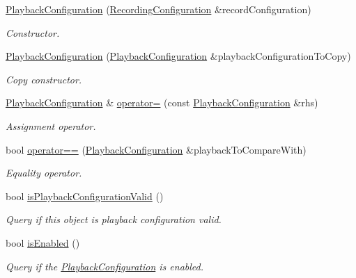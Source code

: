 \begin{DoxyCompactItemize}
\item 
\hyperlink{class_playback_configuration_a9c8f27b87b192cb6c34517087975bf48}{Playback\+Configuration} (\hyperlink{class_recording_configuration}{Recording\+Configuration} \&record\+Configuration)
\begin{DoxyCompactList}\small\item\em Constructor. \end{DoxyCompactList}\item 
\hyperlink{class_playback_configuration_a49c473c5400f547d931a1fc5d9164a68}{Playback\+Configuration} (\hyperlink{class_playback_configuration}{Playback\+Configuration} \&playback\+Configuration\+To\+Copy)
\begin{DoxyCompactList}\small\item\em Copy constructor. \end{DoxyCompactList}\item 
\hyperlink{class_playback_configuration}{Playback\+Configuration} \& \hyperlink{class_playback_configuration_ac3a2de4a2492134dc7d1351e37550e46}{operator=} (const \hyperlink{class_playback_configuration}{Playback\+Configuration} \&rhs)
\begin{DoxyCompactList}\small\item\em Assignment operator. \end{DoxyCompactList}\item 
bool \hyperlink{class_playback_configuration_a928896b44f93175d1e3f6ec6388fc002}{operator==} (\hyperlink{class_playback_configuration}{Playback\+Configuration} \&playback\+To\+Compare\+With)
\begin{DoxyCompactList}\small\item\em Equality operator. \end{DoxyCompactList}\item 
bool \hyperlink{class_playback_configuration_a1797bbadc6876281456c7b46b9a88655}{is\+Playback\+Configuration\+Valid} ()
\begin{DoxyCompactList}\small\item\em Query if this object is playback configuration valid. \end{DoxyCompactList}\item 
bool \hyperlink{class_playback_configuration_a1006624edfe48ca6f1a2fd97a5cbf6f7}{is\+Enabled} ()
\begin{DoxyCompactList}\small\item\em Query if the \hyperlink{class_playback_configuration}{Playback\+Configuration} is enabled. \end{DoxyCompactList}\item 

\end{DoxyCompactItemize}
